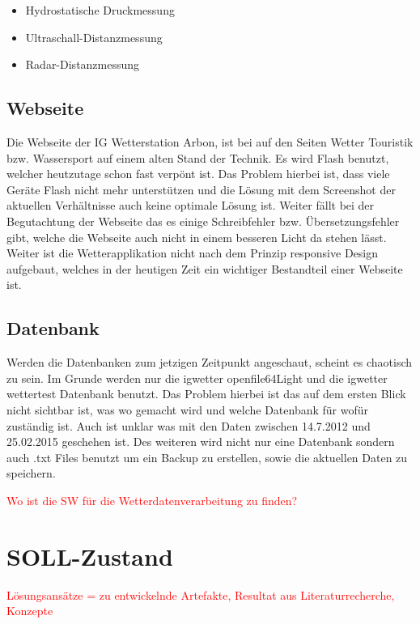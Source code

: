 \documentclass[a4paper,ngerman, 11pt]{report}
\newcommand\Diskussionspunkt[1]{\textcolor{red}{#1}}
\begin{document}
\begin{itemize}  
\item Hydrostatische Druckmessung
\item Ultraschall-Distanzmessung
\item Radar-Distanzmessung
\end{itemize}



\subsection{Webseite}
Die Webseite der IG Wetterstation Arbon, ist bei auf den Seiten Wetter Touristik bzw. Wassersport auf einem alten Stand der Technik. Es wird Flash benutzt, welcher heutzutage schon fast verpönt ist. Das Problem hierbei ist, dass viele Geräte Flash nicht mehr unterstützen und die Lösung mit dem Screenshot der aktuellen Verhältnisse auch keine optimale Lösung ist. Weiter fällt bei der Begutachtung der Webseite das es einige Schreibfehler bzw. Übersetzungsfehler gibt, welche die Webseite auch nicht in einem besseren Licht da stehen lässt. Weiter ist die Wetterapplikation nicht nach dem Prinzip responsive Design aufgebaut, welches in der heutigen Zeit ein wichtiger Bestandteil einer Webseite ist. 
\subsection{Datenbank}
Werden die Datenbanken zum jetzigen Zeitpunkt angeschaut, scheint es chaotisch zu sein. Im Grunde werden nur die igwetter openfile64Light und die igwetter wettertest Datenbank benutzt. Das Problem hierbei ist das auf dem ersten Blick nicht sichtbar ist, was wo gemacht wird und welche Datenbank für wofür zuständig ist. Auch ist unklar was mit den Daten zwischen 14.7.2012 und 25.02.2015 geschehen ist. Des weiteren wird nicht nur eine Datenbank sondern auch .txt Files benutzt um ein Backup zu erstellen, sowie die aktuellen Daten zu speichern. 

\Diskussionspunkt{Wo ist die SW für die Wetterdatenverarbeitung zu finden?}

\section{SOLL-Zustand}
\Diskussionspunkt{Lösungsansätze = zu entwickelnde Artefakte, 
Resultat aus Literaturrecherche, 
Konzepte}
\end{document}
